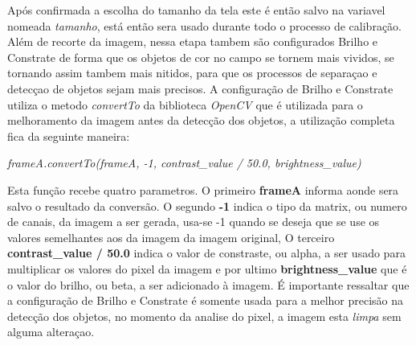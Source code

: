  Após confirmada a escolha do tamanho da tela 
este é então salvo na variavel nomeada \textit{tamanho}, está então sera usado durante todo o processo de calibração.
Além de recorte da imagem, nessa etapa tambem são configurados Brilho e Constrate de forma que os objetos de cor no campo se tornem mais vividos, se tornando assim tambem mais nitidos, para que os processos de separaçao e detecçao de objetos sejam mais precisos.	A configuração de Brilho e Constrate utiliza o metodo \textit{convertTo} da biblioteca \textit{OpenCV} que é utilizada para o melhoramento da imagem antes da detecção dos objetos, a utilização completa fica da seguinte maneira:
\begin{center}
\centering \textit{ frameA.convertTo(frameA, -1, contrast\_value / 50.0, brightness\_value)}
\end{center}
Esta função recebe quatro parametros. O primeiro \textbf{frameA} informa aonde sera salvo o resultado da conversão. O segundo \textbf{-1} indica o tipo da matrix, ou numero de canais, da imagem a ser gerada, usa-se -1 quando se deseja que se use os valores semelhantes aos da imagem da imagem original\cite{OpenCV}, O terceiro \textbf{contrast\_value / 50.0} indica o valor de constraste, ou alpha, a ser usado para multiplicar os valores do pixel da imagem\cite{OpenCV} e por ultimo \textbf{brightness\_value} que é o valor do brilho, ou beta, a ser adicionado à imagem. É importante ressaltar que a configuração de  Brilho e Constrate é somente usada para a melhor precisão na detecção dos objetos, no momento da analise do pixel, a imagem esta \textit{limpa} sem alguma alteraçao.\newline

